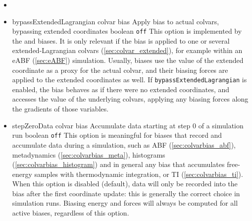 \begin{itemize}
\item %

\item %
  \keydef
    {bypassExtendedLagrangian}{%
    colvar bias}{%
    Apply bias to actual colvars, bypassing extended coordinates}{%
    boolean}{%
    \texttt{off}}{%
    This option is implemented by the  and
     biases.
    It is only relevant if the bias is applied to one or several extended-Lagrangian colvars (\ref{sec:colvar_extended}),
    for example within an eABF (\ref{sec:eABF}) simulation.
    Usually, biases use the value of the extended coordinate as a proxy for the actual colvar, and their biasing forces are applied to the extended coordinates as well.
    If \texttt{bypassExtendedLagrangian} is enabled, the bias behaves as if there were no extended coordinates, and accesses the value of the underlying colvars, applying any biasing forces along the gradients of those variables.}

\item %
  \keydef
    {stepZeroData}{%
    colvar bias}{%
    Accumulate data starting at step 0 of a simulation run}{%
    boolean}{%
    \texttt{off}}{%
    This option is meaningful for biases that record and accumulate data during a simulation, such as ABF (\ref{sec:colvarbias_abf}), metadynamics (\ref{sec:colvarbias_meta}), histograms (\ref{sec:colvarbias_histogram}) and in general any bias that accumulates free-energy samples with thermodynamic integration, or TI (\ref{sec:colvarbias_ti}).
    When this option is disabled (default), data will only be recorded into the bias after the first coordinate update: this is generally the correct choice in simulation runs.
    Biasing energy and forces will always be computed for all active biases, regardless of this option.
  }

\end{itemize}


